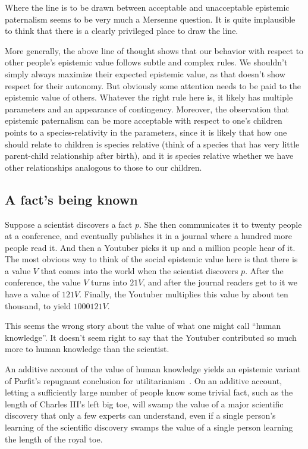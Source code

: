 Where the line is to be drawn between acceptable and unacceptable epistemic paternalism seems to be very
much a Mersenne question. It is quite implausible to think that there is a clearly privileged place to draw
the line. 

More generally, the above line of thought shows that our behavior with respect to other people's epistemic
value follows subtle and complex rules. We shouldn't simply always maximize their expected epistemic value, as that
doesn't show respect for their autonomy. But obviously some attention needs to be paid to the epistemic value of
others.
Whatever the right rule here is, it likely has multiple parameters and an appearance of contingency. 
Moreover, the observation that epistemic paternalism can be more acceptable with respect to one's children points
to a species-relativity in the parameters, since it is likely that how one should relate to children is species
relative (think of a species that has very little parent-child relationship after birth), and it is species relative
whether we have other relationships analogous to those to our children.

\subsection{A fact's being known}
Suppose a scientist discovers a fact $p$. She then communicates it to twenty people at a conference,
and eventually publishes it in a journal where a hundred more people read it. And then a Youtuber picks it up and
a million people hear of it. The most obvious way to think of the social epistemic value here is that there
is a value $V$ that comes into the world when the scientist discovers $p$. After the conference, the value
$V$ turns into $21V$, and after the journal readers get to it we have a value of $121V$. Finally, the Youtuber
multiplies this value by about ten thousand, to yield $1000121V$. 

This seems the wrong story about the value of what one might call ``human knowledge''. It doesn't seem
right to say that the Youtuber contributed so much more to human knowledge than the scientist. 

An additive account of the value of human knowledge yields an epistemic variant of Parfit's repugnant conclusion
for utilitarianism~\parencite[p.~388]{ParfitRP}. On an additive account, letting a sufficiently large number of people know some trivial
fact, such as the length of Charles III's left big toe, will swamp the value of a major scientific discovery that only a few experts can understand, even if a single person's learning of the scientific discovery swamps the value of a single
person learning the length of the royal toe.

